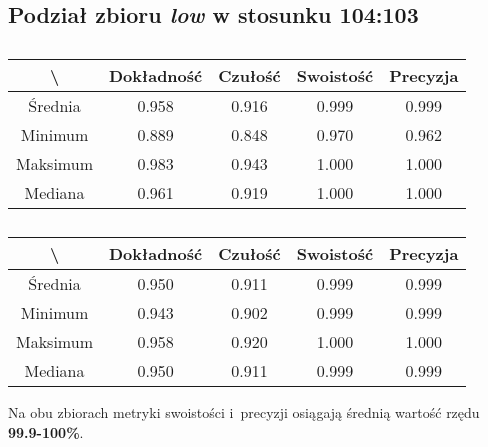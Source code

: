 \subsection{Podział zbioru \textit{low} w stosunku 104:103}
\label{sec:lowsplitd}


\begin{table}[H]
	\centering
	\caption{}
	\vspace{6pt}
	{\footnotesize
		\begin{tabular}{|c|c|c|c|c|}
      \hline \textbackslash & Dokładność & Czułość & Swoistość & Precyzja \\
      \hline Średnia & 0.958 & 0.916 & 0.999 & 0.999 \\
      \hline Minimum & 0.889 & 0.848 & 0.970 & 0.962 \\
      \hline Maksimum & 0.983 & 0.943 & 1.000 & 1.000 \\
      \hline Mediana & 0.961 & 0.919 & 1.000 & 1.000 \\
      \hline
    \end{tabular}
    \label{Tab:lowsplitd_val}
	}
	\vspace{0pt}
\end{table}

\begin{table}[H]
	\centering
	\caption{}
	\vspace{6pt}
	{\footnotesize
		\begin{tabular}{|c|c|c|c|c|}
      \hline \textbackslash & Dokładność & Czułość & Swoistość & Precyzja \\
      \hline Średnia & 0.950 & 0.911 & 0.999 & 0.999 \\
      \hline Minimum & 0.943 & 0.902 & 0.999 & 0.999 \\
      \hline Maksimum & 0.958 & 0.920 & 1.000 & 1.000 \\
      \hline Mediana & 0.950 & 0.911 & 0.999 & 0.999 \\
      \hline
    \end{tabular}
    \label{Tab:lowsplitd_test}
	}
	\vspace{0pt}
\end{table}

Na obu zbiorach metryki swoistości i~precyzji osiągają średnią wartość rzędu \textbf{99.9-100\%}.
